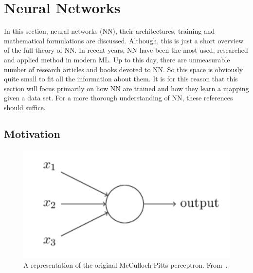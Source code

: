 \section{Neural Networks}
In this section, neural networks (NN), their architectures, training and mathematical formulations are discussed. Although, this is just a short overview of the full theory of NN. In recent years, NN have been the most used, researched and applied method in modern ML. Up to this day, there are unmeasurable number of research articles and books devoted to NN. So this space is obviously quite small to fit all the information about them. It is for this reason that this section will focus primarily on how NN are trained and how they learn a mapping given a data set.
For a more thorough understanding of NN, these references~\cite{mehligMachineLearningNeural2021,goodfellowDeepLearning2016,hastieElementsStatisticalLearning2009,bernerModernMathematicsDeep2021} should suffice.

\subsection{Motivation}
\begin{figure}
    \centering
    \includegraphics[scale=0.4]{figuras/capitulo-3/perceptron}
    \caption{A representation of the original McCulloch-Pitts perceptron. From~\cite{nielsenNeuralNetworksDeep2015}.}
    \label{fig:perceptron}
\end{figure}

